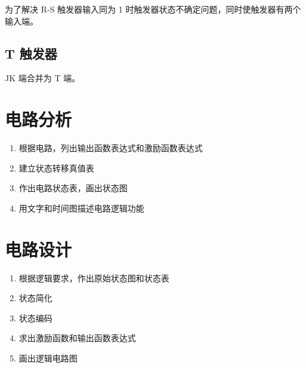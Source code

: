 为了解决 R-S 触发器输入同为 1 时触发器状态不确定问题，同时使触发器有两个输入端。

\subsection{T 触发器}

JK 端合并为 T 端。

\newpage

\section{电路分析}

\begin{enumerate}
    \item 根据电路，列出输出函数表达式和激励函数表达式
    \item 建立状态转移真值表
    \item 作出电路状态表，画出状态图
    \item 用文字和时间图描述电路逻辑功能
\end{enumerate}

\section{电路设计}

\begin{enumerate}
    \item 根据逻辑要求，作出原始状态图和状态表
    \item 状态简化
    \item 状态编码
    \item 求出激励函数和输出函数表达式
    \item 画出逻辑电路图
\end{enumerate}

\newpage
